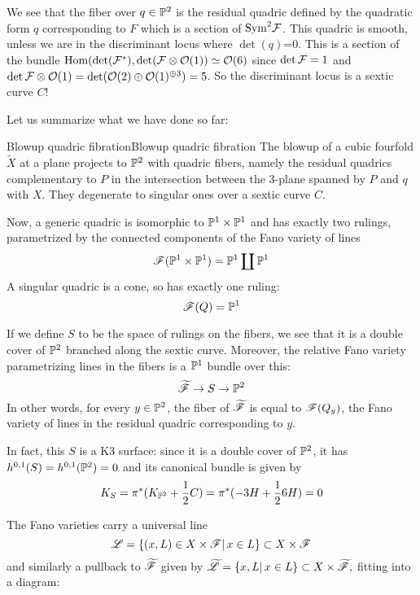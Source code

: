 We see that the fiber over $q \in \P^2$ is the residual quadric defined by the quadratic form $q$ corresponding to $F$ which is a section of $\mathrm{Sym}^2\calF$. This quadric is smooth, unless we are in the discriminant locus where $\det(q)$=0. This is a section of the bundle $\Hom(\det(\calF^*), \det (\calF\otimes \O(1))\simeq \O(6) $ since $\det \calF=1$ and $\det \calF\otimes \O(1)= \det (\O(2) \oplus \O(1)^{\oplus 3})=5$. So the discriminant locus is a sextic curve $C$!

Let us summarize what we have done so far:

\begin{proposition}{Blowup quadric fibration}{Blowup quadric fibration}
    The blowup of a cubic fourfold $\tilde{X}$ at a plane projects to $\P^2$ with quadric fibers, namely the residual quadrics complementary to $P$ in the intersection between the 3-plane spanned by $P$ and $q$ with $X$. They degenerate to singular ones over a sextic curve $C$.
\end{proposition}


Now, a generic quadric is isomorphic to $\P^1 \times \P^1$ and has exactly two rulings, parametrized by the connected components of the Fano variety of lines $$\scrF(\P^1 \times \P^1)=\P^1 \coprod \P^1$$
A singular quadric is a cone, so has exactly one ruling: $$\scrF(Q)=\P^1$$

If we define $S$ to be the space of rulings on the fibers, we see that it is a double cover of $\P^2$ branched along the sextic curve. Moreover, the relative Fano variety parametrizing lines in the fibers is a $\P^1$ bundle over this: $$\tscrF \rightarrow S \rightarrow \P^2$$
In other words, for every $y\in \P^2$, the fiber of $\tscrF$ is equal to $\scrF(Q_y)$, the Fano variety of lines in the residual quadric corresponding to $y$.

In fact, this $S$ is a K3 surface: since it is a double cover of $\P^2$, it has $h^{0,1}(S)=h^{0,1}(\P^2)=0$ and its canonical bundle is given by $$K_S = \pi^*(K_{\P^2}+\frac{1}{2}C)=\pi^*(-3H +\frac{1}{2}6H)=0$$

The Fano varieties carry a universal line  $$\scrL = \{ (x,L)\in X\times \scrF | \, x\in L\} \subset X \times \scrF$$
and similarly a pullback to $\tscrF$ given by $\tscrL = \{ x,L | \, x\in L\} \subset X \times \tscrF,$
fitting into a diagram: 
\begin{center}
\end{center}

